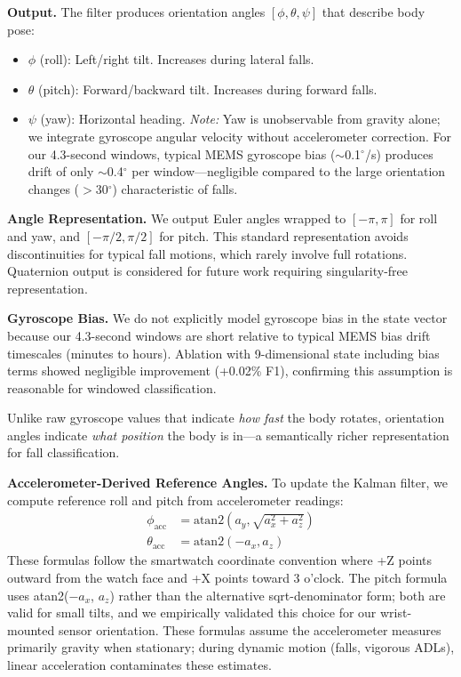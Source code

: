 \textbf{Output.} The filter produces orientation angles $[\phi, \theta, \psi]$ that describe body pose:
\begin{itemize}
    \item $\phi$ (roll): Left/right tilt. Increases during lateral falls.
    \item $\theta$ (pitch): Forward/backward tilt. Increases during forward falls.
    \item $\psi$ (yaw): Horizontal heading. \textit{Note:} Yaw is unobservable from gravity alone; we integrate gyroscope angular velocity without accelerometer correction. For our 4.3-second windows, typical MEMS gyroscope bias ($\sim$0.1$^\circ$/s) produces drift of only $\sim$0.4$^\circ$ per window---negligible compared to the large orientation changes ($>$30$^\circ$) characteristic of falls.
\end{itemize}

\textbf{Angle Representation.} We output Euler angles wrapped to $[-\pi, \pi]$ for roll and yaw, and $[-\pi/2, \pi/2]$ for pitch. This standard representation avoids discontinuities for typical fall motions, which rarely involve full rotations. Quaternion output is considered for future work requiring singularity-free representation.

\textbf{Gyroscope Bias.} We do not explicitly model gyroscope bias in the state vector because our 4.3-second windows are short relative to typical MEMS bias drift timescales (minutes to hours). Ablation with 9-dimensional state including bias terms showed negligible improvement (+0.02\% F1), confirming this assumption is reasonable for windowed classification.

Unlike raw gyroscope values that indicate \textit{how fast} the body rotates, orientation angles indicate \textit{what position} the body is in---a semantically richer representation for fall classification.

\textbf{Accelerometer-Derived Reference Angles.} To update the Kalman filter, we compute reference roll and pitch from accelerometer readings:
\begin{align}
\phi_\text{acc} &= \text{atan2}(a_y, \sqrt{a_x^2 + a_z^2}) \\
\theta_\text{acc} &= \text{atan2}(-a_x, a_z)
\end{align}
These formulas follow the smartwatch coordinate convention where +Z points outward from the watch face and +X points toward 3 o'clock. The pitch formula uses atan2($-a_x$, $a_z$) rather than the alternative sqrt-denominator form; both are valid for small tilts, and we empirically validated this choice for our wrist-mounted sensor orientation. These formulas assume the accelerometer measures primarily gravity when stationary; during dynamic motion (falls, vigorous ADLs), linear acceleration contaminates these estimates.


